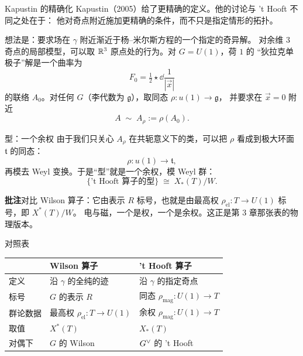 \begin{frame}{Kapustin 的精确化}
   Kapustin（2005）给了更精确的定义。他的讨论与 't Hooft 不同之处在于：
  他对奇点附近施加更精确的条件，而不只是指定情形的拓扑。
  \vspace{0.4em}

   想法是：要求场在 $\gamma$ 附近渐近于杨--米尔斯方程的一个指定的奇异解。
  对余维 $3$ 奇点的局部模型，可以取 $\mathbb{R}^3$ 原点处的行为。对 $G=U(1)$，荷 $1$ 的
  “狄拉克单极子”解是一个曲率为
  \[
    F_0=\tfrac12\star\dd\frac{1}{|\vec x|}
  \]
  的联络 $A_0$。对任何 $G$（李代数为 $\mathfrak g$），取同态 $\rho:u(1)\to\mathfrak g$，
  并要求在 $\vec x=0$ 附近
  \[
    A\;\sim\;A_\rho:=\rho(A_0).
  \]
\end{frame}

\begin{frame}{型：一个余权}
   由于我们只关心 $A_\rho$ 在共轭意义下的类，可以把 $\rho$ 看成到极大环面
  $\mathfrak t$ 的同态：
  \[
    \rho:u(1)\to\mathfrak t ,
  \]
  再模去 Weyl 变换。于是“型”就是一个余权，模 Weyl 群：
  \[
    \{\text{'t Hooft 算子的型}\}\;\cong\;X_*(T)/W .
  \]
  \begin{beizhu}
  \textbf{批注}\quad 对比 Wilson 算子：它由表示 $R$ 标号，也就是由最高权
  $\rho_{\mathrm{el}}:T\to U(1)$ 标号，即 $X^*(T)/W$。
  电与磁，一个是权，一个是余权。这正是第 3 章那张表的物理版本。
  \end{beizhu}
\end{frame}

\begin{frame}{对照表}
  \begin{center}
  \renewcommand{\arraystretch}{1.45}
  \begin{tabular}{@{}lll@{}}
    \toprule
     & Wilson 算子 & 't Hooft 算子 \\
    \midrule
    定义 & 沿 $\gamma$ 的全纯的迹 & 沿 $\gamma$ 的指定奇点 \\
    标号 & $G$ 的表示 $R$ & 同态 $\rho_{\mathrm{mag}}:U(1)\to T$ \\
    群论数据 & 最高权 $\rho_{\mathrm{el}}:T\to U(1)$ & 余权 $\rho_{\mathrm{mag}}:U(1)\to T$ \\
    取值 & $X^*(T)$ & $X_*(T)$ \\
    对偶下 & $G$ 的 Wilson & $G^{\vee}$ 的 't Hooft \\
    \bottomrule
  \end{tabular}
  \end{center}
\end{frame}

